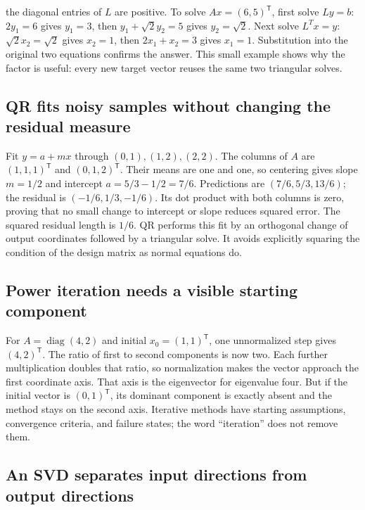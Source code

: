 the diagonal entries of \(L\) are positive. To solve \(Ax=(6,5)^\mathsf T\), first solve \(Ly=b\): \(2y_1=6\) gives \(y_1=3\), then \(y_1+\sqrt2y_2=5\) gives \(y_2=\sqrt2\). Next solve \(L^Tx=y\): \(\sqrt2x_2=\sqrt2\) gives \(x_2=1\), then \(2x_1+x_2=3\) gives \(x_1=1\). Substitution into the original two equations confirms the answer. This small example shows why the factor is useful: every new target vector reuses the same two triangular solves.

\subsection{QR fits noisy samples without changing the residual measure}\label{02-foundations-ii-ch038-qr-fits-noisy-samples-without-changing-the-residual-measure}

Fit \(y=a+mx\) through \((0,1),(1,2),(2,2)\). The columns of \(A\) are \((1,1,1)^\mathsf T\) and \((0,1,2)^\mathsf T\). Their means are one and one, so centering gives slope \(m=1/2\) and intercept \(a=5/3-1/2=7/6\). Predictions are \((7/6,5/3,13/6)\); the residual is \((-1/6,1/3,-1/6)\). Its dot product with both columns is zero, proving that no small change to intercept or slope reduces squared error. The squared residual length is \(1/6\). QR performs this fit by an orthogonal change of output coordinates followed by a triangular solve. It avoids explicitly squaring the condition of the design matrix as normal equations do.

\subsection{Power iteration needs a visible starting component}\label{02-foundations-ii-ch038-power-iteration-needs-a-visible-starting-component}

For \(A=\operatorname{diag}(4,2)\) and initial \(x_0=(1,1)^\mathsf T\), one unnormalized step gives \((4,2)^\mathsf T\). The ratio of first to second components is now two. Each further multiplication doubles that ratio, so normalization makes the vector approach the first coordinate axis. That axis is the eigenvector for eigenvalue four. But if the initial vector is \((0,1)^\mathsf T\), its dominant component is exactly absent and the method stays on the second axis. Iterative methods have starting assumptions, convergence criteria, and failure states; the word ``iteration'' does not remove them.

\subsection{An SVD separates input directions from output directions}\label{02-foundations-ii-ch038-an-svd-separates-input-directions-from-output-directions}

